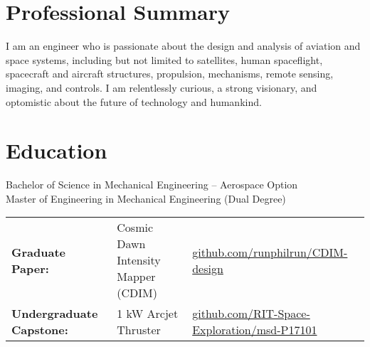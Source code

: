 \documentclass[10pt,final,sans]{resume}
\begin{document}
\setlength\headheight{28pt} %

\section{Professional Summary}
I am an engineer who is passionate about the design and analysis of
aviation and space systems, including but not limited to satellites, human
spaceflight, spacecraft and aircraft structures, propulsion, mechanisms, remote sensing, 
imaging, and controls. I am relentlessly curious, a strong visionary, and
optomistic about the future of technology and humankind.

\section{Education}
Bachelor of Science in Mechanical Engineering -- Aerospace Option \\
Master of Engineering in Mechanical Engineering (Dual Degree) \\
\begin{tabular}{@{}lll@{}}
{\bf Graduate Paper:} & Cosmic Dawn Intensity Mapper (CDIM) & \href{https://github.com/runphilrun/CDIM-design/blob/master/cdim_design.pdf}{github.com/runphilrun/CDIM-design} \\
{\bf Undergraduate Capstone:} & 1 kW Arcjet Thruster & \href{https://github.com/RIT-Space-Exploration/msd-P17101/blob/master/p17101.pdf}{github.com/RIT-Space-Exploration/msd-P17101}
\end{tabular}
\end{document}

